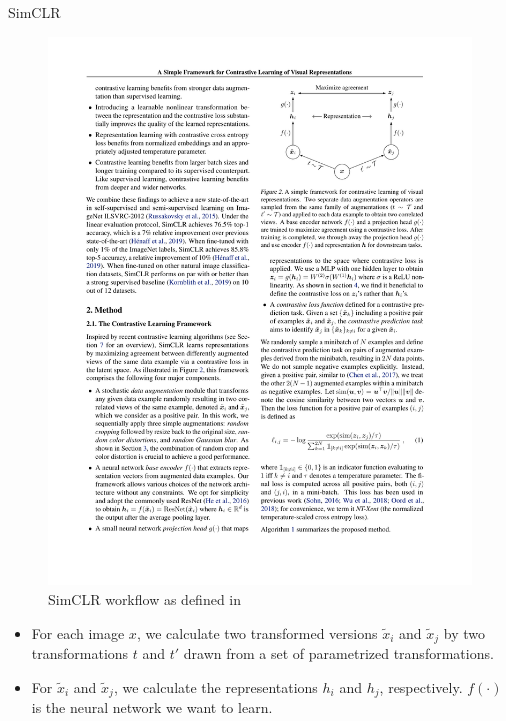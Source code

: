\documentclass[xcolor=pdftex,dvipsnames,table]{beamer}
\begin{document}
\begin{frame}{SimCLR \cite{Chen2020}}
\begin{figure}[htb]
   \centering
   \includegraphics[height=0.4\textheight]{../graphics/sim_clr.pdf}
   \caption{SimCLR workflow as defined in \cite{Chen2020}}
\end{figure}
\begin{itemize}
\item For each image $x$, we calculate two transformed versions $\tilde{x}_i$ and $\tilde{x}_j$ by two transformations $t$ and $t'$ drawn from a set of parametrized transformations. 
\item For $\tilde{x}_i$ and $\tilde{x}_j$, we calculate the representations $h_i$ and $h_j$, respectively. $f(\cdot)$ is the neural network we want to learn. 
\end{itemize}
\end{frame}
\end{document}
